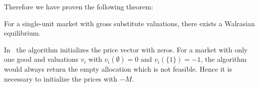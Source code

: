 Therefore we have proven the following theorem:

\begin{theorem}
	For a single-unit market with gross substitute valuations, there exists a Walrasian equilibrium.
\end{theorem}

\begin{bemerkung}
	In~\cite{PaesLeme2017} the algorithm initializes the price vector with zeros.
	For a market with only one good and valuations $v_i$ with $v_i(\emptyset) = 0$ and $v_i(\{ 1 \}) = -1$, the algorithm would always return the empty allocation which is not feasible.
	Hence it is necessary to initialize the prices with $-M$.
\end{bemerkung}